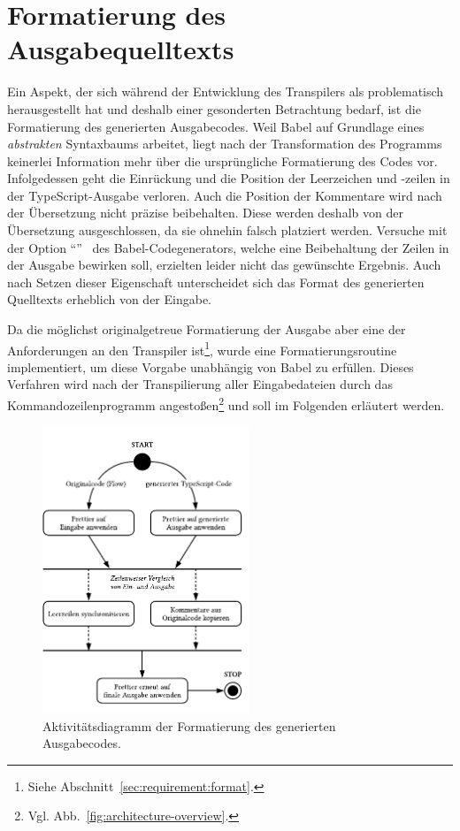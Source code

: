 \section{Formatierung des Ausgabequelltexts}
\label{sec:formatting}

Ein Aspekt, der sich während der Entwicklung des Transpilers als problematisch herausgestellt hat und deshalb einer gesonderten Betrachtung bedarf, ist die Formatierung des generierten Ausgabecodes. Weil Babel auf Grundlage eines \emph{abstrakten} Syntaxbaums arbeitet, liegt nach der Transformation des Programms keinerlei Information mehr über die ursprüngliche Formatierung des Codes vor. Infolgedessen geht die Einrückung und die Position der Leerzeichen und -zeilen in der TypeScript-Ausgabe verloren. Auch die Position der Kommentare wird nach der Übersetzung nicht präzise beibehalten. Diese werden deshalb von der Übersetzung ausgeschlossen, da sie ohnehin falsch platziert werden. Versuche mit der Option \enquote{}~\autocite{BABEL:GENERATOR} des Babel-Codegenerators, welche eine Beibehaltung der Zeilen in der Ausgabe bewirken soll, erzielten leider nicht das gewünschte Ergebnis. Auch nach Setzen dieser Eigenschaft unterscheidet sich das Format des generierten Quelltexts erheblich von der Eingabe.

Da die möglichst originalgetreue Formatierung der Ausgabe aber eine der Anforderungen an den Transpiler ist\footnote{Siehe Abschnitt~\ref{sec:requirement:format}.}, wurde eine Formatierungsroutine implementiert, um diese Vorgabe unabhängig von Babel zu erfüllen. Dieses Verfahren wird nach der Transpilierung aller Eingabedateien durch das Kommandozeilenprogramm angestoßen\footnote{Vgl. Abb.~\ref{fig:architecture-overview}.} und soll im Folgenden erläutert werden.

\begin{figure}[htb]
  \centering
  \includegraphics[width=0.55\textwidth]{src/4_Umsetzung/fig/activity-diagram-formatting.pdf}
  \caption[Aktivitätsdiagramm der Formatierung des Ausgabecodes]{Aktivitätsdiagramm der Formatierung des generierten Ausgabecodes.}
  \label{fig:activity-diagram-formatting}
\end{figure}


